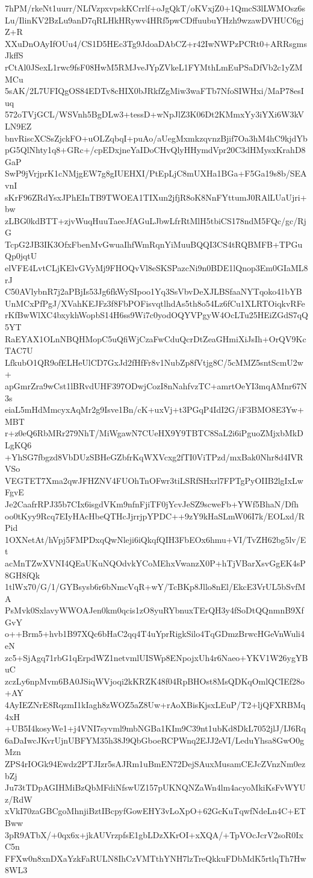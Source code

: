 7hPM/rkeNt1uurr/NLfVzpxvpskKCrrlf+oJgQkT/oKVxjZ0+1QmcS3lLWMOsz6s
Lu/IlinKV2BzLu9anD7qRLHkHRywv4HRf5pwCDffuubuYHzh9wzawDVHUC6gjZ+R
XXuDnOAyIfOUu4/CS1D5HEc3Tg9JdoaDAbCZ+r42IwNWPzPCRt0+ARRsgmsJkffS
rCtAl0JSexL1rwc9fsF08HwM5RMJveJYpZVkeL1FYMthLmEuPSaDfVb2c1yZMMCu
5sAK/2L7UFIQgOS84EDTv8cHIX0bJRkfZgMiw3waFTb7NfoSIWHxi/MaP78esIuq
572oTVjGCL/WSVnh5BgDLw3+tessD+wNpJlZ3K06Dt2KMmxYy3iYXi6W3kVLN9EZ
bnvRiscXCSsZjckFO+uOLZqbqI+puAo/aUegMxmkzqvnzBjif7Oa3hM4hC9kjdYb
pG5QlNhty1q8+GRc+/cpEDxjneYaIDoCHvQlyHHymdVpr20C3dHMysxKrahD8GaP
SwP9jVrjprK1cNMjgEW7g8gIUEHXI/PtEpLjC8mUXHa1BGa+F5Ga19s8b/SEAvnI
sKrF96ZRdYsxJPhEInTB9TWOEA1TIXun2jfjR8oK8NnFYttumJ0RAlLUaUjri+bw
zLBG0kdBTT+zjvWuqHuuTaeeJfAGuLJbwLfrRtMlH5tbiCS178ndM5FQc/gc/RjG
TcpG2JB3IK3OfxFbenMvGwuaIhfWmRqnYiMuuBQQI3CS4tRQBMFB+TPGuQp0jqtU
elVFE4LvtCLjKElvGVyMj9FHOQvVl8eSKSPazcNi9n0BDE1lQnop3Em0GIaML8rJ
C50AVlybnR7j2aPBjIs53Jg6fkWySIpoo1Yq3SsVbvDeXJLBSfaaNYTqoko41bYB
UnMCxPfPgJ/XVahKEJFz3f8FbPOFisvqtlhdAs5th8o54Lz6fCu1XLRTOiqkvRFe
rKfBwWlXC4bxykhWopbS14H6ss9Wi7c0yodOQYVPgyW4OcLTu25HEiZGdS7qQ5YT
RaEYAX1OLnNBQHMopC5uQfiWjCzaFwCduQcrDtZeaGHmiXiJsIh+OrQV9KcTAC7U
LfkubO1QR9ofELHeUlCD7GxJd2fHfFr8v1NubZp8fVtjg8C/5cMMZ5sntScmU2w+
apGmrZra9wCst1lBRvdUHF397ODwjCozI8nNahfvzTC+amrtOeYI3mqAMnr67N3s
eiaL5mHdMmcyxAqMr2g9Isve1Bn/cK+uxVj+t3PGqP4IdI2G/iF3BMO8E3Yw+MBT
r+z0eQ6RbMRr279NhT/MiWgawN7CUeHX9Y9TBTC8SaL2i6iPguoZMjxbMkDLgKQ6
+YhSG7fbgzd8VbDUzSBHeGZbfrKqWXVcxg2fTI0ViTPzd/mxBak0Nhr8d4IVRVSo
VEGTET7Xma2qwJFHZNV4FUOhTnOFwr3tiLSRfSHxrl7FPTgPyOIIB2lgIxLwFgvE
Je2CaafrRPJ35b7CIx6isgdVKm9nfnFjiTF0jYcvJeSZ9scweFb+YWf5BhaN/Dfh
oo0tKyy9Rcq7EIyHAcHbeQTHcJjrrjpYPDC++9zY9kHaSLmW06I7k/EOLxd/RPid
1OXNetAt/hVpj5FMPDxqQwNleji6iQkqfQIH3FbEOx6hmu+VI/TvZH62bg5lv/Et
acMnTZwXVNI4QEaUKuNQOdvkYCoMEhxVwanzX0P+hTjVBarXsvGgEK4sP8GH8fQk
1tlWx70/G/1/GYBsysb6r6bNmcVqR+wY/TcBKp8Jllo8nEl/EkcE3VrUL5bSvfMA
PsMvk0SxlavyWWOAJen0km0qcis1zO8yuRYbnuxTErQH3y4fSoDtQQnmnB9XfGvY
o++Brm5+hvb1B97XQc6bHaC2qq4T4uYprRigkSilo4TqGDmzBrwcHGeVnWuli4eN
zc5+SjAgq71rbG1qErpdWZ1netvmlUISWp8ENpojxUh4r6Naeo+YKV1W26ygYBuC
zczLy6npMvm6BA0JSiqWVjoqi2kKRZK48f04RpBHOst8MsQDKqOmlQCIEf28o+AY
4AyIEZNrE8RqzmI1kIagh8zWOZ5aZ8Uw+rAoXBisKjsxLEuP/T2+ljQFXRBMq4xH
+UB5I4kosyWe1+j4VNI7syvml9mbNGBa1KIm9C39nt1ubKd8DkL7052jlJ/IJ6Rq
6aDaIwcJKvrUjnUBFYM35h38J9QbGboeRCPWnq2EJJ2eVI/LeduYhsa8GwO0gMzn
ZPS4rIOGk94Ewdz2PTJIzr5sAJRm1uBmEN72DejSAuxMusamCEJcZVnzNm0ezbZj
Ju73tTDpAGIHMiBzQbMFdiNfswUZ157pUKNQNZaWn4lm4acyoMkiKsFvWYUz/RdW
xVkI70zaGBCgoMhnjiBztIBcpyfGowEHY3vLoXpO+62GcKuTqwfNdeLn4C+ETBww
3pR9ATbX/+0qx6x+jkAUVrzpfsE1gbLDzXKrOI+xXQA/+TpVOcJcrV2soR0IxC5n
FFXw0n8xnDXaYzkFaRULN8IhCzVMTthYNH7lzTreQkkuFDbMdK5rtlqTh7Hw8WL3
